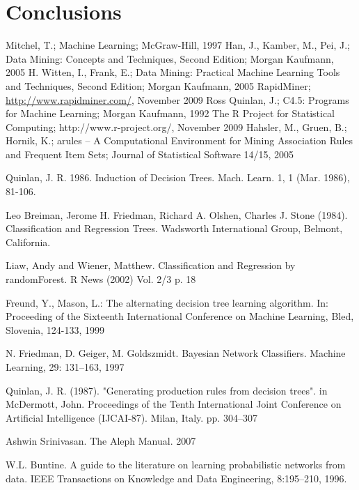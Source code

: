 \documentclass[a4paper]{llncs}
\begin{document}
\section{Conclusions}

\begin{thebibliography}{1}
Mitchel, T.; Machine Learning; McGraw-Hill, 1997
Han, J., Kamber, M., Pei, J.; Data Mining: Concepts and Techniques, Second Edition; Morgan Kaufmann, 2005
H. Witten, I., Frank, E.; Data Mining: Practical Machine Learning Tools and Techniques, Second Edition; Morgan Kaufmann, 2005
RapidMiner; \url{http://www.rapidminer.com/}, November 2009
Ross Quinlan, J.; C4.5: Programs for Machine Learning; Morgan Kaufmann, 1992
The R Project for Statistical Computing; http://www.r-project.org/, November 2009
Hahsler, M., Gruen, B.; Hornik, K.; arules -- A Computational Environment for Mining Association Rules and Frequent Item Sets; Journal of Statistical Software 14/15, 2005

Quinlan, J. R. 1986. Induction of Decision Trees. Mach. Learn. 1, 1 (Mar. 1986), 81-106.

Leo Breiman, Jerome H. Friedman, Richard A. Olshen, Charles J. Stone (1984). Classification and Regression Trees. Wadsworth International Group, Belmont, California.

Liaw, Andy and Wiener, Matthew. Classification and Regression by randomForest. R News (2002) Vol. 2/3 p. 18

Freund, Y., Mason, L.: The alternating decision tree learning algorithm. In: Proceeding of the Sixteenth International Conference on Machine Learning, Bled, Slovenia, 124-133, 1999

N. Friedman, D. Geiger, M. Goldszmidt. Bayesian Network Classifiers. Machine Learning, 29: 131–163, 1997

Quinlan, J. R. (1987). "Generating production rules from decision trees". in McDermott, John. Proceedings of the Tenth International Joint Conference on Artificial Intelligence (IJCAI-87). Milan, Italy. pp. 304–307

Ashwin Srinivasan. The Aleph Manual. 2007

W.L. Buntine. A guide to the literature on learning probabilistic networks from data. IEEE 
Transactions on Knowledge and Data Engineering, 8:195–210, 1996.


\end{thebibliography}
\end{document}
